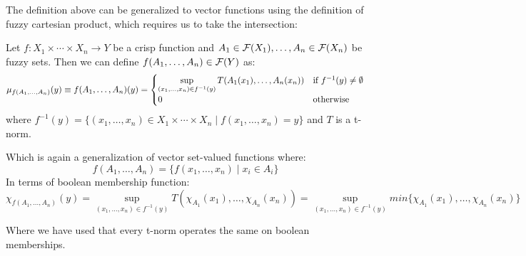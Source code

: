 The definition above can be generalized to vector functions using the definition of fuzzy cartesian product, which requires us to take the intersection:

\begin{definition}
  Let $f: X_1 \times \cdots \times X_n \longrightarrow Y$ be a crisp function and $A_1 \in \mathcal{F}(X_1), \ldots, A_n \in \mathcal{F}(X_n)$ be fuzzy sets. Then we can define $f(A_1,\ldots,A_n)\in \mathcal{F}(Y)$ as:
  \[
  \mu_{f(A_1,\ldots,A_n)}(y)\equiv f(A_1,\ldots,A_n)(y) = 
  \begin{cases}
    \sup_{(x_1,\ldots,x_n)\in f^{-1}(y)} T(A_1(x_1),\ldots,A_n(x_n)) & \textnormal{if } f^{-1}(y)\neq \emptyset\\
    0 & \textnormal{otherwise}
  \end{cases}
  \]
  where $f^{-1}(y)=\{(x_1,\ldots,x_n)\in X_1\times\cdots\times X_n \mid f(x_1,\ldots,x_n)=y\}$ and $T$ is a t-norm.
\end{definition}

Which is again a generalization of vector set-valued functions where: $$f(A_1,\ldots,A_n)= \{f(x_1,\ldots,x_n)\mid x_i\in A_i\}$$
In terms of boolean membership function:
$$\chi _{f(A_1,\ldots,A_n)}(y)=\sup_{(x_1,\ldots,x_n)\in f^{-1}(y)}T(\chi_{A_1}(x_1),\ldots,\chi_{A_n}(x_n)) = \sup_{(x_1,\ldots,x_n)\in f^{-1}(y)}min\{\chi_{A_1}(x_1),\ldots,\chi_{A_n}(x_n)\}$$

Where we have used that every t-norm operates the same on boolean memberships. \\

